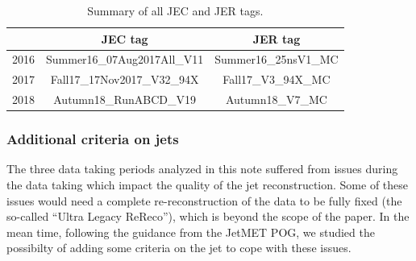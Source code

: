 \begin{table}[h!]
    \centering
    \begin{tabular}{c|c c }
       & JEC tag & JER tag      \\
\hline %
2016 & Summer16\_07Aug2017All\_V11 & Summer16\_25nsV1\_MC \\
\hline %
2017 & Fall17\_17Nov2017\_V32\_94X & Fall17\_V3\_94X\_MC \\
\hline %
2018 & Autumn18\_RunABCD\_V19 & Autumn18\_V7\_MC \\
\hline %

     \end{tabular}
\small
    \caption{Summary of all JEC and JER tags.}%
    \label{tab:jecjer}
\end{table}




\subsubsection{Additional criteria on jets}
\label{sec:jetstudies}
The three data taking periods analyzed in this note suffered from issues during the data taking which impact the quality of the jet reconstruction. Some of these issues would need a complete re-reconstruction of the data to be fully fixed (the so-called ``Ultra Legacy ReReco''), which is beyond the scope of the paper. In the mean time, following the guidance from the JetMET POG, we studied the possibilty of adding some criteria on the jet to cope with these issues. 

